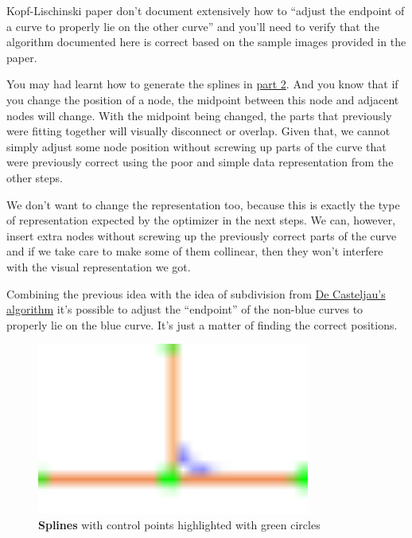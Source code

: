 Kopf-Lischinski paper don't document extensively how to ``adjust the endpoint of
a curve to properly lie on the other curve'' and you'll need to verify that the
algorithm documented here is correct based on the sample images provided in the
paper.

You may had learnt how to generate the splines in \hyperref[blogpart2]{part 2}.
And you know that if you change the position of a node, the midpoint between
this node and adjacent nodes will change. With the midpoint being changed, the
parts that previously were fitting together will visually disconnect or overlap.
Given that, we cannot simply adjust some node position without screwing up parts
of the curve that were previously correct using the poor and simple data
representation from the other steps.

We don't want to change the representation too, because this is exactly the type
of representation expected by the optimizer in the next steps. We can, however,
insert extra nodes without screwing up the previously correct parts of the curve
and if we take care to make some of them collinear, then they won't interfere
with the visual representation we got.

Combining the previous idea with the idea of subdivision from
\href{http://en.wikipedia.org/wiki/De_Casteljau's_algorithm}{De Casteljau's
algorithm} it's possible to adjust the ``endpoint'' of the non-blue curves to
properly lie on the blue curve. It's just a matter of finding the correct
positions.

\begin{figure}[H]
  \centering
  \includegraphics[width=0.8\textwidth]{assets/subdivision.pdf}
  \caption{\textbf{Splines} with control points highlighted with green circles}
\end{figure}

